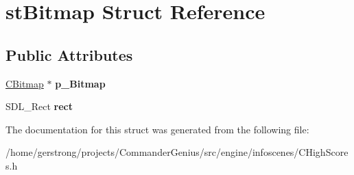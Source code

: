 \hypertarget{structst_bitmap}{
\section{stBitmap Struct Reference}
\label{structst_bitmap}
}
\subsection*{Public Attributes}
\begin{DoxyCompactItemize}
\item 
\hypertarget{structst_bitmap_ab88583e204db54f9533ac5884e29d926}{
\hyperlink{class_c_bitmap}{CBitmap} $\ast$ {\bfseries p\_\-Bitmap}}
\label{structst_bitmap_ab88583e204db54f9533ac5884e29d926}

\item 
\hypertarget{structst_bitmap_a71240551d9fce2bcc48c9fd2887e151a}{
SDL\_\-Rect {\bfseries rect}}
\label{structst_bitmap_a71240551d9fce2bcc48c9fd2887e151a}

\end{DoxyCompactItemize}


The documentation for this struct was generated from the following file:\begin{DoxyCompactItemize}
\item 
/home/gerstrong/projects/CommanderGenius/src/engine/infoscenes/CHighScores.h\end{DoxyCompactItemize}

